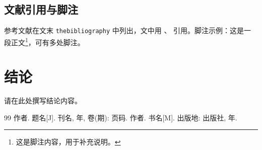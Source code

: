 \documentclass{article}
\begin{document}
\subsection{文献引用与脚注}
参考文献在文末 \texttt{thebibliography} 中列出，文中用 \cite{ref1}、\cite{ref2} 引用。脚注示例：这是一段正文\footnote{这是脚注内容，用于补充说明。}，可有多处脚注。

\section{结论}
请在此处撰写结论内容。

\begin{thebibliography}{99}
 作者. 题名[J]. 刊名, 年, 卷(期): 页码.
 作者. 书名[M]. 出版地: 出版社, 年.
\end{thebibliography}
\end{document}

